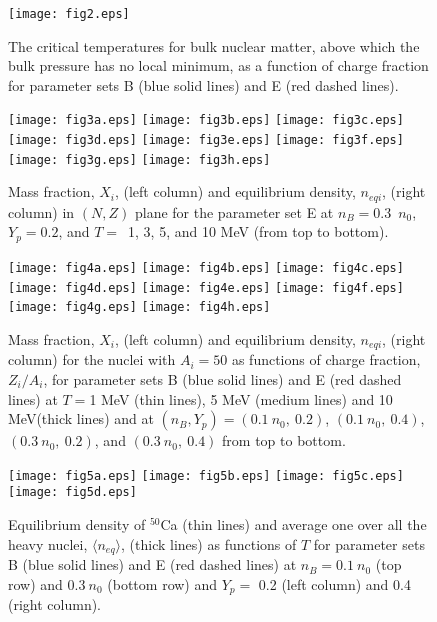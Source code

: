\documentclass[preprint]{revtex4}
\begin{document}
{{{\begin{figure}
\texttt{[image: fig2.eps]}
\caption{The critical temperatures for bulk nuclear matter, above which the bulk pressure has no local minimum,  as a function of charge fraction 
for parameter sets  B (blue solid lines) and E (red dashed  lines).}
\label{fig_crt}
\end{figure}



\begin{figure}
\texttt{[image: fig3a.eps]}
\texttt{[image: fig3b.eps]}
\texttt{[image: fig3c.eps]}
\texttt{[image: fig3d.eps]}
\texttt{[image: fig3e.eps]}
\texttt{[image: fig3f.eps]}
\texttt{[image: fig3g.eps]}
\texttt{[image: fig3h.eps]}%
\caption{
 Mass fraction, $X_i$,  (left column) and equilibrium  density, $n_{eqi}$, (right column)
in $(N, Z)$ plane   for the parameter set  E
at $n_B=0.3$~$n_0$, $Y_p=0.2$, and $T=$~1, 3, 5, and 10  MeV (from top to bottom). 
}
\label{fig_dis2}
\end{figure}





\begin{figure}
\texttt{[image: fig4a.eps]}
\texttt{[image: fig4b.eps]}
\texttt{[image: fig4c.eps]}
\texttt{[image: fig4d.eps]}
\texttt{[image: fig4e.eps]}
\texttt{[image: fig4f.eps]}
\texttt{[image: fig4g.eps]}
\texttt{[image: fig4h.eps]}
\caption{
 Mass fraction, $X_i$,  (left column) and equilibrium  density, $n_{eqi}$, (right column)
for the nuclei with $A_i=50$ as functions of charge fraction, $Z_i/A_i$,  
 for parameter sets  B (blue solid lines) and E (red dashed  lines) 
at  $T=$1 MeV (thin lines), 5 MeV (medium lines) and 10  MeV(thick lines)
and at $(n_B,Y_p)= (0.1 \ n_0, \ 0.2)$, $ (0.1 \ n_0, \ 0.4)$, $(0.3 \ n_0, \ 0.2)$, and $ (0.3 \ n_0, \ 0.4)$ from top to bottom.}
\label{fig_iso}
\end{figure}

\begin{figure}
\texttt{[image: fig5a.eps]}
\texttt{[image: fig5b.eps]}
\texttt{[image: fig5c.eps]}
\texttt{[image: fig5d.eps]}
\caption{Equilibrium density of $^{50}$Ca  (thin lines) and average one over all the heavy nuclei,  $\langle n_{eq} \rangle$, %
(thick lines) as  functions of  $T$
for parameter sets  B (blue solid lines) and E (red dashed  lines) 
at  $n_B=0.1 \ n_0$ (top row) and  $0.3  \ n_0$ (bottom row)
and $Y_p=$ 0.2 (left column) and 0.4 (right column).
}
\label{fig_satu}
\end{figure}

}}}
\end{document}
